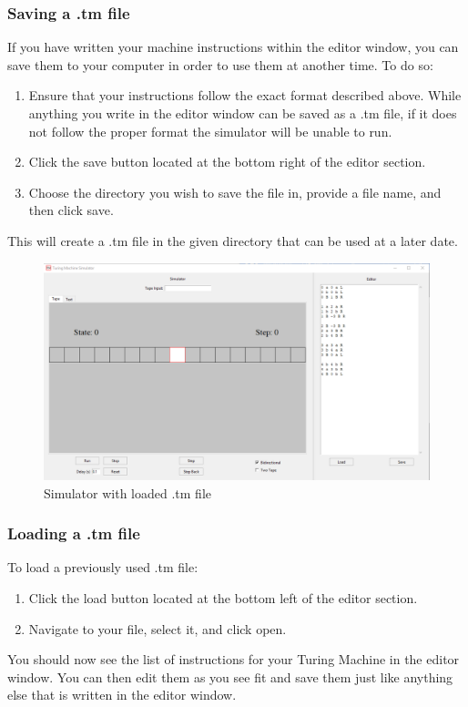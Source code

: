 \documentclass[12pt,letterpaper]{article}
\begin{document}
	\subsubsection{Saving a .tm file}
	\noindent If you have written your machine instructions within the editor window, you can save them to your computer in order to use them at another time. To do so: \begin{enumerate}
		\item Ensure that your instructions follow the exact format described above. While anything you write in the editor window can be saved as a .tm file, if it does not follow the proper format the simulator will be unable to run.
		\item Click the save button located at the bottom right of the editor section.
		\item Choose the directory you wish to save the file in, provide a file name, and then click save.
	\end{enumerate}
	This will create a .tm file in the given directory that can be used at a later date.
	
	\begin{figure}[hbt!]
		\includegraphics[scale=.4]{images/simulator_loaded.png}
		\caption{Simulator with loaded .tm file}
	\end{figure}

	\subsubsection{Loading a .tm file}
	\noindent To load a previously used .tm file:
	\begin{enumerate}
		\item Click the load button located at the bottom left of the editor section.
		\item Navigate to your file, select it, and click open.
	\end{enumerate}
	You should now see the list of instructions for your Turing Machine in the editor window. You can then edit them as you see fit and save them just like anything else that is written in the editor window.\\
\end{document}

